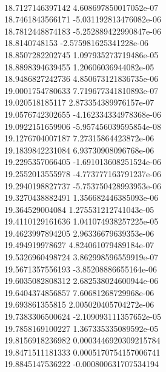 { \\
18.7127146397142 4.608697850017052e-07
 \\
18.7461843566171 -5.031192813476082e-06
 \\
18.7812448874183 -5.252889422990847e-06
 \\
18.8140748153 -2.575981625341228e-06
 \\
18.8507282202745 1.097935273719486e-05
 \\
18.8898394639455 1.20606036944082e-05
 \\
18.9486827242736 4.850673121836735e-06
 \\
19.0001754780633 7.719677341810893e-07
 \\
19.020518185117 2.873354389976157e-07
 \\
19.0576742302655 -4.162334334978368e-06
 \\
19.0922151659906 -5.957456039595854e-08
 \\
19.1276704007187 7.27315864423872e-06
 \\
19.1839842231084 6.93730908096768e-06
 \\
19.2295357066405 -1.691013608251524e-06
 \\
19.2552013555978 -4.773777163791237e-06
 \\
19.2940198827737 -5.753750428993953e-06
 \\
19.3270438882491 1.356682446385093e-06
 \\
19.364529004084 1.275531212741043e-05
 \\
19.4110129161636 1.041074938257225e-05
 \\
19.4623997894205 2.96336679639353e-06
 \\
19.494919978627 4.824061079489184e-07
 \\
19.5326960498724 3.862998596559919e-07
 \\
19.5671357556193 -3.85208886655164e-06
 \\
19.6035082808312 2.682538024600944e-06
 \\
19.6404374856857 7.60681268729968e-06
 \\
19.693861355815 2.005020405704272e-06
 \\
19.7383306500624 -2.109093111357652e-05
 \\
19.7858169100227 1.367335335089592e-05
 \\
19.8156918236982 0.0003446920309215784
 \\
19.8471511181333 0.0005170754157006741
 \\
19.8845147536222 -0.000800631707534194
 \\
}
